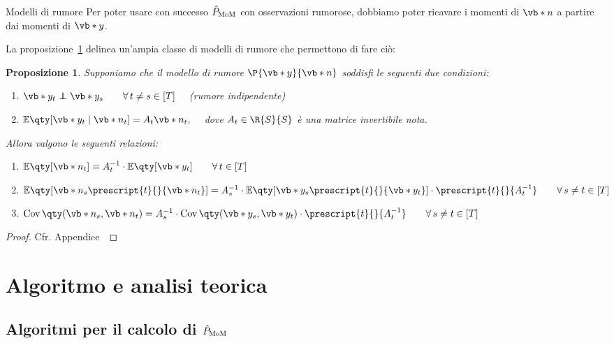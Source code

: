 \documentclass[10pt,xcolor={table,dvipsnames}]{beamer} 		%
\theoremstyle{plain}					%
\newtheorem{proposizione}{Proposizione}%
\theoremstyle{definition}
\theoremstyle{remark}
\newcommand{\transpose}[1]{\prescript{t}{}{#1}}
\newcommand{\Cov}[1]{\operatorname{Cov}\qty(#1)}
\newcommand\independent{\protect\mathpalette{\protect\independenT}{\perp}}
\def\independenT#1#2{\mathrel{\rlap{$#1#2$}\mkern2mu{#1#2}}}
\begin{document}
	\begin{frame}
		{\hypertarget{frame:prop_noise_model}{Modelli di rumore}}
		Per poter usare con successo $\hat{P}_{\textup{MoM}}$ con osservazioni rumorose,
		dobbiamo poter ricavare i momenti di $\vb*{n}$ a partire dai momenti di $\vb*{y}$.

		
		La proposizione~\ref{prop:noise_model} delinea un'ampia classe di modelli 
		di rumore che permettono di fare ciò:
		\begin{proposizione}\label{prop:noise_model}
			Supponiamo che il modello di rumore $\P{\vb*{y}}{\vb*{n}}$ soddisfi le seguenti
			due condizioni:
			\begin{enumerate}
				\item $\vb*{y}_t\independent\vb*{y}_s\qquad\forall\,t\ne s\in[T]\quad$ {\smaller (rumore indipendente)}
				\item $\mathbb{E}\qty[\vb*{y}_t\mid\vb*{n}_t]=A_t\vb*{n}_t,\quad$ dove $A_t\in\R{S}{S}$ è una 
				matrice \emph{invertibile} nota.
			\end{enumerate}
			Allora valgono le seguenti relazioni:
			\begin{enumerate}
				\item $\mathbb{E}\qty[\vb*{n}_t]=A_t^{-1}\cdot\mathbb{E}\qty[\vb*{y}_t]\qquad\forall\,t\in[T]$
				\item $\mathbb{E}\qty[\vb*{n}_s\transpose{\vb*{n}_t}]=A_s^{-1}\cdot\mathbb{E}\qty[\vb*{y}_s\transpose{\vb*{y}_t}]\cdot\transpose{A_t^{-1}}\qquad\forall\,s\ne t\in[T]$
				\item $\Cov{\vb*{n}_s,\vb*{n}_t}=A_s^{-1}\cdot\Cov{\vb*{y}_s,\vb*{y}_t}\cdot\transpose{A_t^{-1}}\qquad\forall\,s\ne t\in[T]$
			\end{enumerate}
		\end{proposizione}
		\begin{proof}
			Cfr. Appendice~\hyperlink{frame:dim_prop_noise_model:appendice}{\faHandPointRight}
		\end{proof}
	\end{frame}



\section{Algoritmo e analisi teorica}
    \subsection{Algoritmi per il calcolo di \texorpdfstring{$\hat{P}_{\textup{MoM}}$}{P}}
\end{document}
